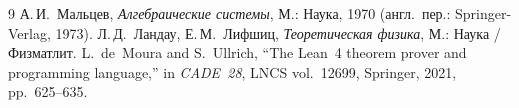 \documentclass[11pt,a4paper]{article}
\theoremstyle{plain}
\theoremstyle{definition}
\begin{document}
\begin{thebibliography}{9}
А.\,И.~Мальцев, \emph{Алгебраические системы}, М.: Наука, 1970 (англ.\ пер.: Springer-Verlag, 1973).
Л.\,Д.~Ландау, Е.\,М.~Лифшиц, \emph{Теоретическая физика}, М.: Наука / Физматлит.
L.~de~Moura and S.~Ullrich, ``The Lean~4 theorem prover and programming language,'' in \emph{CADE~28}, LNCS vol.~12699, Springer, 2021, pp.~625--635.
\end{thebibliography}
\end{document}
